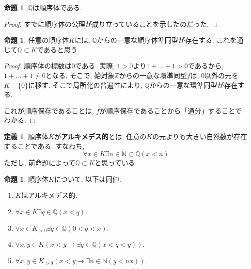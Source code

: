 \documentclass[a4paper, twoside]{bxjsarticle}
\newcommand{\nat}{\mathbb{N}}
\newcommand{\zah}{\mathbb{Z}}
\newcommand{\quo}{\mathbb{Q}}
\theoremstyle{definition}
\newtheorem{prop}[thm]{命題}
\newtheorem{defn}[thm]{定義}
\begin{document}
        \begin{prop}
            $\quo$は順序体である.
        \end{prop}
        \begin{proof}
            すでに順序体の公理が成り立っていることを示したのだった. 
        \end{proof}
        \begin{prop}
            任意の順序体$K$には, $\quo$からの一意な順序体準同型が存在する. これを通じて$\quo\subset K$であると思う.
        \end{prop}
        \begin{proof}
            順序体の標数は0である. 実際, $1>0$より$1+\dots+1>0$であるから, $1+\dots+1\neq 0$となる. そこで, 始対象$\zah$からの一意な環準同型$f$は, 0以外の元を$K-\{0\}$に移す. そこで局所化の普遍性により, $\quo$からの一意な環準同型が存在する.
            
            これが順序保存であることは,  $f$が順序保存であることから「通分」することでわかる.
        \end{proof}
        \begin{defn}
            順序体$K$が\textbf{アルキメデス的}とは, 任意の$K$の元よりも大きい自然数が存在することである. すなわち, \[\forall x\in K \exists n\in \nat\subset\quo (x<n)\]
            ただし, 前命題によって$\quo\subset K$と思っている.
        \end{defn}
        \begin{prop}
            順序体$K$について, 以下は同値.
            \begin{enumerate}
                \item $K$はアルキメデス的.
                \item $\forall x\in K \exists q\in\quo (x<q)$.
                \item $\forall x\in K_{>0} \exists q\in \quo (0<q<x)$.
                \item $\forall x, y\in K (x<y\to \exists q\in\quo (x<q<y))$.
                \item $\forall x, y\in K_{>0} (x<y\to \exists n\in\nat (y<nx))$.
            \end{enumerate}
        \end{prop}
\end{document}
